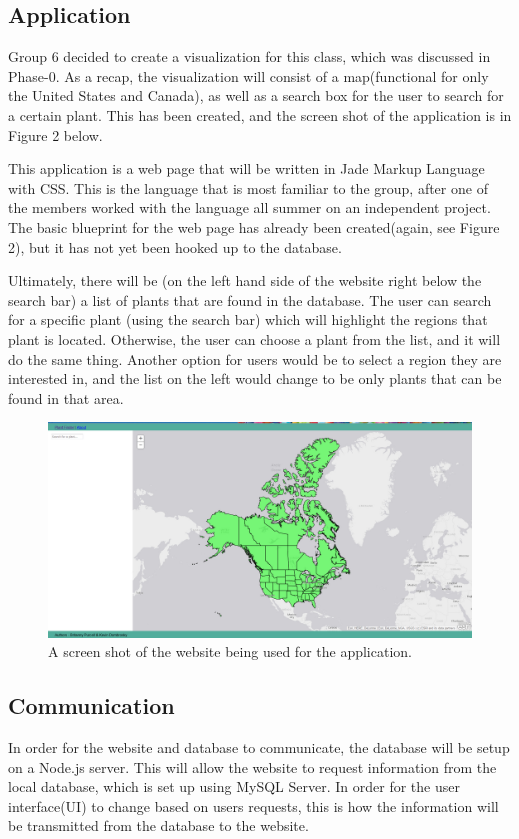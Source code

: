 \documentclass{Group6_Phase2}
\begin{document}
\subsection{Application}
Group 6 decided to create a visualization for this class, which was discussed in Phase-0. As a recap, the visualization will consist of a map(functional for only the United States and Canada), as well as a search box for the user to search for a certain plant. This has been created, and the screen shot of the application is in Figure 2 below. 

This application is a web page that will be written in Jade Markup Language with CSS. This is the language that is most familiar to the group, after one of the members worked with the language all summer on an independent project. The basic blueprint for the web page has already been created(again, see Figure 2), but it has not yet been hooked up to the database. 

Ultimately, there will be (on the left hand side of the website right below the search bar) a list of plants that are found in the database. The user can search for a specific plant (using the search bar) which will highlight the regions that plant is located. Otherwise, the user can choose a plant from the list, and it will do the same thing. Another option for users would be to select a region they are interested in, and the list on the left would change to be only plants that can be found in that area. 

\begin{figure}[htb]
	\centering
	\includegraphics[scale=0.17]{Website_Screenshot.png}
	\caption{A screen shot of the website being used for the application.}
\end{figure}
\subsection{Communication}
In order for the website and database to communicate, the database will be setup on a Node.js server. This will allow the website to request information from the local database, which is set up using MySQL Server. In order for the user interface(UI) to change based on users requests, this is how the information will be transmitted from the database to the website. 
\end{document}
